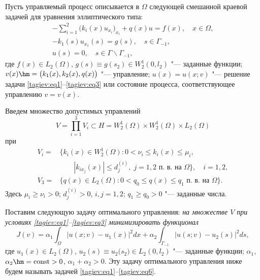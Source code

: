 Пусть управляемый процесс описывается в $\Omega $ следующей смешанной  краевой задачей для уравнения эллиптического типа:
\begin{gather}
\label{tagiev:eq1}
-\sum\limits_{i=1}^2 \big(k_i ( x )u_{x_i} \big)_{x_i}+q( x )u=f( x ),\quad x \in \Omega,\\ 
\label{tagiev:eq3}
-k_1 ( s )u_{x_1 } (s)=g( s ),\quad s\in \Gamma_{-1},\\
\label{tagiev:eq3}
u( s )=0,\quad s \in \Gamma \backslash \Gamma _{-1},
\end{gather}
где $f( x )\in L_2 ( \Omega )$, $g( s) \equiv g (s_2 )\in W_2^1 ( 0, l  _2 )$ 
"--- заданные функции; 
$ v  ( x ) \hm =\bigl(k_1( x ),k_2(x),q (x) \bigr)$ "--- управление; 
$u(x)=u (x; v )$ "--- решение задачи \eqref{tagiev:eq1}--\eqref{tagiev:eq3} 
или состояние процесса, соответствующее управлению $ v  = v (x)$.

Введем множество допустимых управлений
\begin{equation}
\label{tagiev:eq5}
V=\prod \limits_{i=1}^3 V_i \subset H=W_2^1 ( \Omega )\times  W_2^1 ( \Omega )\times L_2(\Omega) 
\end{equation}
при
\begin{equation}
\label{tagiev:eq5}
\begin{aligned}
V_i =& \bigl\{ k_i ( x )\in W_2^1 ( \Omega ):0<\nu _i \le k_i ( x )\le \mu _i, \quad  \\
&~~~~~~~~~|k_{ix_j} ( x ) | \le d_j^{( i )}, \; j=1, 2\,\, \text{п.~в. на }\Omega \bigr\},\quad i=1, 2,\\
V_3 =& \bigl \{ q ( x )\in L_2 ( \Omega ):0<q_0 \le q ( x )\le q_1 \,\, \text{п.~в. на }\Omega \bigr\}.
\end{aligned}
\end{equation}
Здесь $\mu_i \ge \nu_i >0$; $d_j^{( i )} >0$, $i, j=1, 2$; $q_1 \ge q_0 >0$ "--- заданные числа.

Поставим следующую задачу оптимального управления: {\it на множестве $V$ при 
условиях \eqref{tagiev:eq1}--\eqref{tagiev:eq3} минимизировать функционал }
\begin{equation}
\label{tagiev:eq6}
J (  v  )=\alpha _1 \int _\Omega  \big| u (x; v )-u_1 ( x ) \big|^2dx +\alpha_2 
\int _{\Gamma_{-1}} \big|u (s; v )-u_2( s ) \big|^2ds,
\end{equation}
где $u_1 ( x )\in L_2 ( \Omega )$, $u_2 ( s )\equiv u_2 \big(s_2\big)\in L_2 (0, l _2)$ "--- заданные функции; $\alpha _1$, $\alpha _2 \hm ={\rm const}>0$,  $\alpha_1+\alpha _2 >0$. 
Эту задачу оптимального управления ниже будем называть задачей \eqref{tagiev:eq1}--\eqref{tagiev:eq6}.

